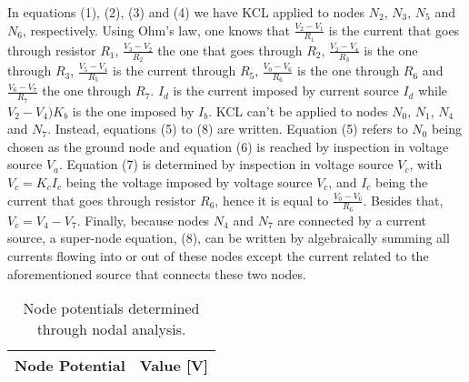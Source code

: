 \par
 In equations (1), (2), (3) and (4) we have KCL applied to nodes $N_2$, $N_3$, $N_5$ and $N_6$, respectively.  Using Ohm's law, one knows that $\frac{V_2 - V_1}{R_1}$ is the current that goes through resistor $R_1$, $\frac{V_3-V_2}{R_2}$ the one that goes through $R_2$, $\frac{V_2-V_4}{R_3}$ is the one through $R_3$, $\frac{V_5-V_4}{R_5}$ is the current through $R_5$, $\frac{V_0-V_6}{R_6}$ is the one through $R_6$ and $\frac{V_6-V_7}{R_7}$ the one through $R_7$. $I_d$ is the current imposed by current source $I_d$ while $V_2-V_4)K_b$ is the one imposed by $I_b$. KCL can't be applied to nodes $N_0$, $N_1$, $N_4$ and $N_7$. Instead, equations (5) to (8) are written. Equation (5) refers to $N_0$ being chosen as the ground node and equation (6) is reached by inspection in voltage source $V_a$. Equation (7) is determined by inspection in voltage source $V_c$, with $V_c = K_c I_c$ being the voltage imposed by voltage source $V_c$, and $I_c$ being the current that goes through resistor $R_6$, hence it is equal to $\frac{V_0 - V_6}{R_6}$. Besides that, $V_c = V_4-V_7$. Finally, because nodes $N_4$ and $N_7$ are connected by a current source, a super-node equation, (8), can be written by algebraically summing all currents flowing into or out of these nodes except the current related to the aforementioned source that connects these two nodes.



\begin{table}[hbt!]
  \centering
  \begin{tabular}{|c|c|}
    \hline    
    {\bf Node Potential} & {\bf Value [V]} \\ \hline
    
  \end{tabular}
  \caption{Node potentials determined through nodal analysis.}
  \label{tab:node}
\end{table}



